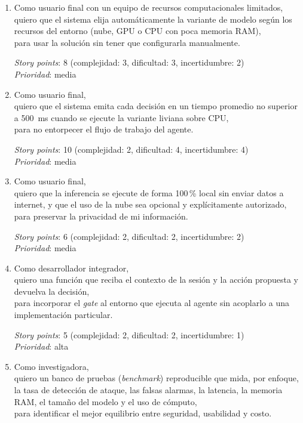 \documentclass[
11pt, %
]{charter}
\begin{document}
\begin{enumerate}
	\textit{Story points}: 11 (complejidad: 3, dificultad: 4, incertidumbre: 4) \\
	\textit{Prioridad}: media

	\item Como usuario final con un equipo de recursos computacionales limitados, \\
	quiero que el sistema elija automáticamente la variante de modelo según los recursos del entorno (nube, GPU o CPU con poca memoria RAM), \\
	para usar la solución sin tener que configurarla manualmente.

	\textit{Story points}: 8 (complejidad: 3, dificultad: 3, incertidumbre: 2) \\
	\textit{Prioridad}: media

	\item Como usuario final, \\
	quiero que el sistema emita cada decisión en un tiempo promedio no superior a 500~ms cuando se ejecute la variante liviana sobre CPU, \\
	para no entorpecer el flujo de trabajo del agente.

	\textit{Story points}: 10 (complejidad: 2, dificultad: 4, incertidumbre: 4) \\
	\textit{Prioridad}: media

	\item Como usuario final, \\
	quiero que la inferencia se ejecute de forma 100\,\% local sin enviar datos a internet, y que el uso de la nube sea opcional y explícitamente autorizado, \\
	para preservar la privacidad de mi información.

	\textit{Story points}: 6 (complejidad: 2, dificultad: 2, incertidumbre: 2) \\
	\textit{Prioridad}: media

	\item Como desarrollador integrador, \\
	quiero una función que reciba el contexto de la sesión y la acción propuesta y devuelva la decisión, \\
	para incorporar el \textit{gate} al entorno que ejecuta al agente sin acoplarlo a una implementación particular.

	\textit{Story points}: 5 (complejidad: 2, dificultad: 2, incertidumbre: 1) \\
	\textit{Prioridad}: alta

	\item Como investigadora, \\
	quiero un banco de pruebas (\textit{benchmark}) reproducible que mida, por enfoque, la tasa de detección de ataque, las falsas alarmas, la latencia, la memoria RAM, el tamaño del modelo y el uso de cómputo, \\
	para identificar el mejor equilibrio entre seguridad, usabilidad y costo.


\end{enumerate}
\end{document}
